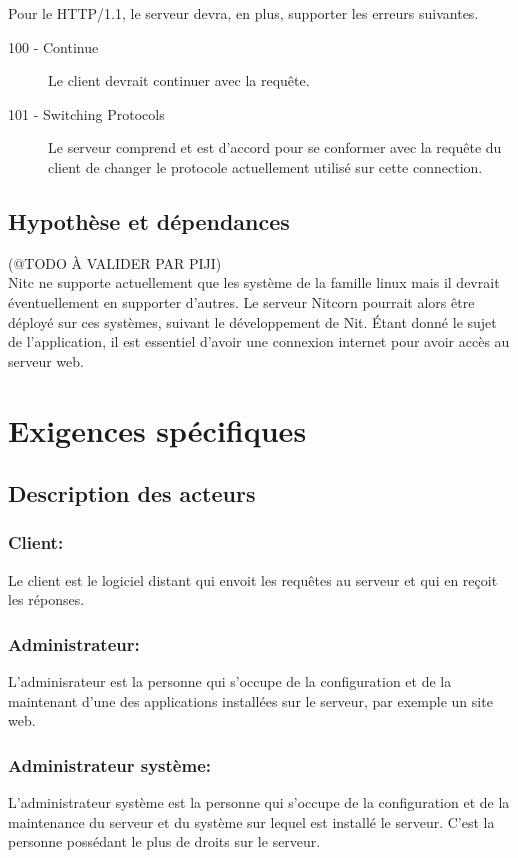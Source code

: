 \documentclass{scrreprt}
\begin{document}
 Pour le HTTP/1.1, le serveur devra, en plus, supporter les erreurs suivantes.\\
 \begin{description}
 \item [100 - Continue] Le client devrait continuer avec la requête.
 \item [101 - Switching Protocols] Le serveur comprend et est d'accord pour se conformer avec la requête du client de changer le protocole actuellement utilisé sur cette connection.
 \end{description}
    
\section{Hypothèse et dépendances}
(@TODO À VALIDER PAR PIJI)\\
Nitc ne supporte actuellement que les système de la famille linux mais il devrait éventuellement en supporter d'autres. Le serveur Nitcorn pourrait alors être déployé sur ces systèmes, suivant le développement de Nit.
Étant donné le sujet de l'application, il est essentiel d'avoir une connexion internet pour avoir accès au serveur web.\\


\chapter{Exigences spécifiques}
\section{Description des acteurs}
\subsection{Client:} Le client est le logiciel distant qui envoit les requêtes au serveur et qui en reçoit les réponses. 
\subsection{Administrateur:} L'adminisrateur est la personne qui s'occupe de la configuration et de la maintenant d'une des applications installées sur le serveur, par exemple un site web.
\subsection{Administrateur système:} L'administrateur système est la personne qui s'occupe de la configuration et de la maintenance du serveur et du système sur lequel est installé le serveur. C'est la personne possédant le plus de droits sur le serveur.
\end{document}
